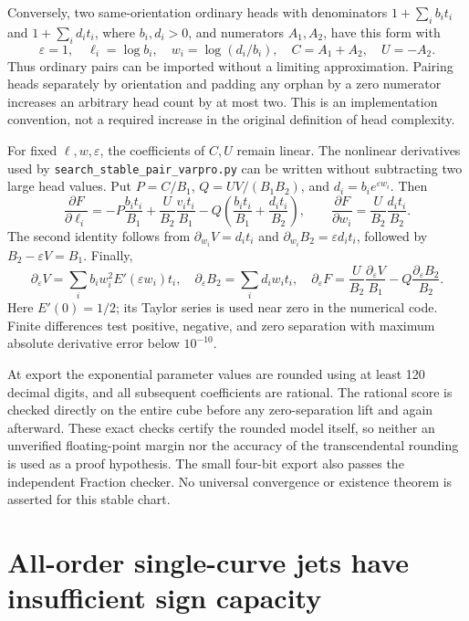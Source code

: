 \documentclass[11pt]{article}
\begin{document}
Conversely, two same-orientation ordinary heads with denominators
$1+\sum_i b_it_i$ and $1+\sum_i d_it_i$, where $b_i,d_i>0$, and
numerators $A_1,A_2$, have this form with
\[
 \varepsilon=1,\quad \ell_i=\log b_i,\quad
 w_i=\log(d_i/b_i),\quad C=A_1+A_2,\quad U=-A_2.
\]
Thus ordinary pairs can be imported without a limiting approximation.
Pairing heads separately by orientation and padding any orphan by a
zero numerator increases an arbitrary head count by at most two.
This is an implementation convention, not a required increase in the
original definition of head complexity.

For fixed $\ell,w,\varepsilon$, the coefficients of $C,U$ remain
linear. The nonlinear derivatives used by
\texttt{search\_stable\_pair\_varpro.py} can be written without
subtracting two large head values. Put
$P=C/B_1$, $Q=UV/(B_1B_2)$, and $d_i=b_ie^{\varepsilon w_i}$.
Then
\[
 \frac{\partial F}{\partial\ell_i}
 =-P\frac{b_it_i}{B_1}
   +\frac{U}{B_2}\frac{v_it_i}{B_1}
   -Q\left(\frac{b_it_i}{B_1}+\frac{d_it_i}{B_2}\right),
 \qquad
 \frac{\partial F}{\partial w_i}
 =\frac{U}{B_2}\frac{d_it_i}{B_2}.
\]
The second identity follows from
$\partial_{w_i}V=d_it_i$ and
$\partial_{w_i}B_2=\varepsilon d_it_i$, followed by
$B_2-\varepsilon V=B_1$. Finally,
\[
 \partial_\varepsilon V=\sum_i b_iw_i^2E'(\varepsilon w_i)t_i,
 \quad \partial_\varepsilon B_2=\sum_i d_iw_it_i,
 \quad
 \partial_\varepsilon F=\frac{U}{B_2}
       \frac{\partial_\varepsilon V}{B_1}
       -Q\frac{\partial_\varepsilon B_2}{B_2}.
\]
Here $E'(0)=1/2$; its Taylor series is used near zero in the numerical
code. Finite differences test positive, negative, and zero separation
with maximum absolute derivative error below $10^{-10}$.

At export the exponential parameter values are rounded using at least
120 decimal digits, and all subsequent coefficients are rational.
The rational score is checked directly on the entire cube before any
zero-separation lift and again afterward. These exact checks certify
the rounded model itself, so neither an unverified floating-point
margin nor the accuracy of the transcendental rounding is used as a
proof hypothesis. The small four-bit export also passes the independent
Fraction checker. No universal convergence or existence theorem is
asserted for this stable chart.

\section{All-order single-curve jets have insufficient sign capacity}
\end{document}
